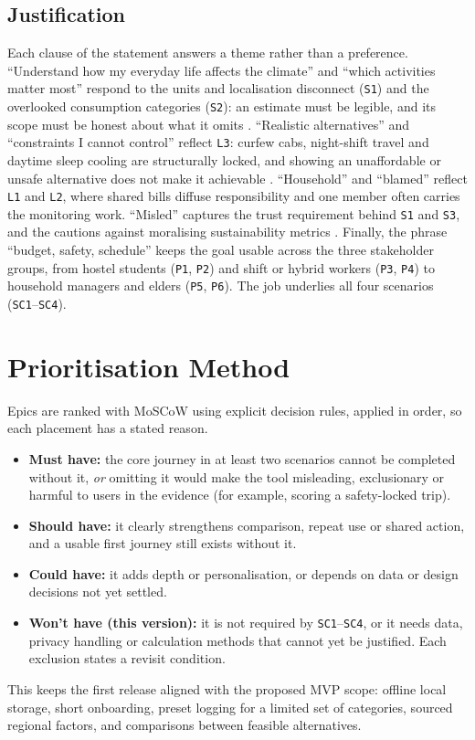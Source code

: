 \documentclass[12pt, a4paper]{article}
\begin{document}
\subsection{Justification}
Each clause of the statement answers a theme rather than a preference. ``Understand how my everyday life affects the climate'' and ``which activities matter most'' respond to the units and localisation disconnect (\texttt{S1}) and the overlooked consumption categories (\texttt{S2}): an estimate must be legible, and its scope must be honest about what it omits \cite{lee2021, shi2021, grinstein2018}. ``Realistic alternatives'' and ``constraints I cannot control'' reflect \texttt{L3}: curfew cabs, night-shift travel and daytime sleep cooling are structurally locked, and showing an unaffordable or unsafe alternative does not make it achievable \cite{collins2020}. ``Household'' and ``blamed'' reflect \texttt{L1} and \texttt{L2}, where shared bills diffuse responsibility and one member often carries the monitoring work. ``Misled'' captures the trust requirement behind \texttt{S1} and \texttt{S3}, and the cautions against moralising sustainability metrics \cite{brynjarsdottir2012}. Finally, the phrase ``budget, safety, schedule'' keeps the goal usable across the three stakeholder groups, from hostel students (\texttt{P1}, \texttt{P2}) and shift or hybrid workers (\texttt{P3}, \texttt{P4}) to household managers and elders (\texttt{P5}, \texttt{P6}). The job underlies all four scenarios (\texttt{SC1}--\texttt{SC4}).

\section{Prioritisation Method}
Epics are ranked with MoSCoW using explicit decision rules, applied in order, so each placement has a stated reason.
\begin{itemize}
    \item \textbf{Must have:} the core journey in at least two scenarios cannot be completed without it, \emph{or} omitting it would make the tool misleading, exclusionary or harmful to users in the evidence (for example, scoring a safety-locked trip).
    \item \textbf{Should have:} it clearly strengthens comparison, repeat use or shared action, and a usable first journey still exists without it.
    \item \textbf{Could have:} it adds depth or personalisation, or depends on data or design decisions not yet settled.
    \item \textbf{Won't have (this version):} it is not required by \texttt{SC1}--\texttt{SC4}, or it needs data, privacy handling or calculation methods that cannot yet be justified. Each exclusion states a revisit condition.
\end{itemize}
This keeps the first release aligned with the proposed MVP scope: offline local storage, short onboarding, preset logging for a limited set of categories, sourced regional factors, and comparisons between feasible alternatives.
\end{document}
